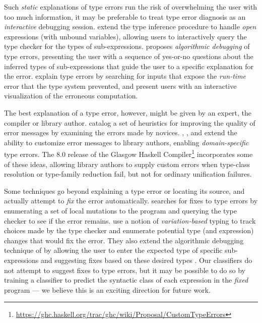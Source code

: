 Such \emph{static} explanations of type errors run the risk of
overwhelming the user with too much information, it may be preferable to
treat type error diagnosis as an \emph{interactive} debugging session.
%
\citet{Bernstein1995-yj} extend the type inference procedure to handle
\emph{open} expressions (\ie with unbound variables), allowing users to
interactively query the type checker for the types of sub-expressions.
%
\citet{Chitil2001-td} proposes \emph{algorithmic debugging} of type
errors, presenting the user with a sequence of yes-or-no questions about
the inferred types of sub-expressions that guide the user to a specific
explanation for the error.
%
\citet{Seidel2016-ul} explain type errors by searching for inputs that
expose the \emph{run-time} error that the type system prevented, and
present users with an interactive visualization of the erroneous
computation.

%
The best explanation of a type error, however, might be given by an
expert, \eg the compiler or library author.
%
\citet{Hage2006-hc} catalog a set of heuristics for
improving the quality of error messages by examining the errors made by
novices.
%
\citet{Heeren2003-db}, \citet{Christiansen2014-qc}, and
\citet{Serrano2016-oo} extend the ability to customize error messages to
library authors, enabling \emph{domain-specific} type errors.
%
The 8.0 release of the
Glasgow Haskell Compiler\footnote{\url{https://ghc.haskell.org/trac/ghc/wiki/Proposal/CustomTypeErrors}}
incorporates some of these ideas, allowing library authors to supply
custom errors when type-class resolution or type-family reduction fail,
but not for ordinary unification failures.


Some techniques go beyond explaining a type error or locating its
source, and actually attempt to \emph{fix} the error automatically.
%
\citet{Lerner2007-dt} searches for fixes to type errors by enumerating a
set of local mutations to the program and querying the type checker to
see if the error remains.
%
\citet{Chen2014-gd} use a notion of \emph{variation-based} typing to
track choices made by the type checker and enumerate potential type (and
expression) changes that would fix the error.
%
They also extend the algorithmic debugging technique of
\citeauthor{Chitil2001-td} by allowing the user to enter the expected
type of specific sub-expressions and suggesting fixes based on these
desired types \citeyear{Chen2014-vm}.
%
Our classifiers do not attempt to suggest fixes to type errors, but it
may be possible to do so by training a classifier to predict the
syntactic class of each expression in the \emph{fixed} program --- we
believe this is an exciting direction for future work.

